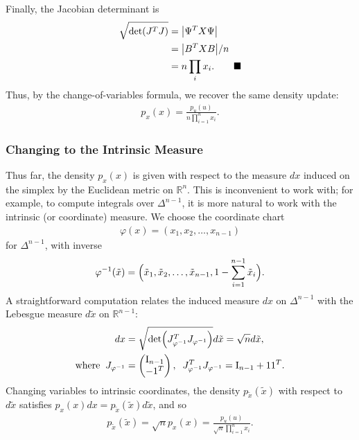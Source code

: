 Finally, the Jacobian determinant is
\begin{align*}
    \sqrt{\Det{J^T J}} & = \AbsDet{\Psi^T X \Psi}               \\
                       & = \AbsDet{B^T X B} / n                 \\
                       & = n \prod_i x_i. \tag*{$\blacksquare$}
\end{align*}
Thus, by the change-of-variables formula, we recover the same density update:
\begin{align}
    \boxed{p_x(x) = \frac{p_u(u)}{n\prod_{i=1}^{n} x_i}.}
\end{align}

\subsubsection{Changing to the Intrinsic Measure}\label{sec:supp:simplex_intrinsic_measure}

Thus far, the density $p_x(x)$ is given with respect to the measure $dx$ induced on the simplex by the Euclidean metric on $\mathbb{R}^n$.
This is inconvenient to work with;
for example, to compute integrals over $\Delta^{n-1}$, it is more natural to work with the intrinsic (or coordinate) measure.
We choose the coordinate chart
\begin{align}
    \varphi(x) = (x_1, x_2, \ldots, x_{n-1})
\end{align}
for $\Delta^{n-1}$, with inverse
\begin{align}
    \varphi^{-1}(\tilde{x}) = \Bigl(\tilde{x}_1, \tilde{x}_2, \ldots, \tilde{x}_{n-1}, 1-\sum_{i=1}^{n-1}\tilde{x}_i\Bigr).
\end{align}
A straightforward computation relates the induced measure $dx$ on $\Delta^{n-1}$ with the Lebesgue measure $d\tilde{x}$ on $\mathbb{R}^{n-1}$:
\begin{align}
    dx               & = \sqrt{\Det{ J_{\varphi^{-1}}^T J_{\varphi^{-1}} }} d\tilde{x} = \sqrt{n} d\tilde{x}, \\
    \text{where} \;\;
    J_{\varphi^{-1}} & = \begin{pmatrix} \Id_{n-1} \\ -\One^T \end{pmatrix},
    \;\;
    J_{\varphi^{-1}}^T J_{\varphi^{-1}} = \Id_{n-1} + \One \One^T. \nonumber
\end{align}
Changing variables to intrinsic coordinates, the density $p_{\tilde{x}}(\tilde{x})$ with respect to $d\tilde{x}$ satisfies $p_x(x) dx = p_{\tilde{x}}(\tilde{x}) d\tilde{x}$, and so
\begin{align}
    \boxed{p_{\tilde{x}}(\tilde{x}) = \sqrt{n} p_x(x) = \frac{p_u(u)}{\sqrt{n}\prod_{i=1}^{n}x_i}.}
\end{align}

